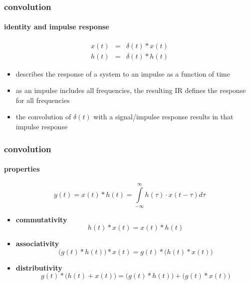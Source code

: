 \begin{frame}\frametitle{convolution}\framesubtitle{identity and impulse response}
    \begin{eqnarray*}
        x(t) &=& \delta(t)\ast x(t) \\
        h(t) &=& \delta(t)\ast h(t) 
    \end{eqnarray*}

    \bigskip
    \begin{itemize}
        \item<2->   describes the response of a system to an impulse as a function of time
        \smallskip
        \item<3->   as an impulse includes all frequencies, the resulting IR defines the response for all frequencies
        \smallskip
        \item<4->   the convolution of $\delta(t)$ with a signal/impulse response results in that impulse response
    \end{itemize}
\end{frame}
    
	\begin{frame}\frametitle{convolution}\framesubtitle{properties}
		\begin{equation*}
			y(t) = x(t) \ast h(t) = \int\limits_{-\infty}^{\infty}{h(\tau)\cdot x(t-\tau)} d\tau
		\end{equation*}
		\begin{itemize}
			\item	\textbf{commutativity}
				\begin{equation*}
					h(t) \ast x(t)	= x(t) \ast h(t)
				\end{equation*}
			\pause
			\item	\textbf{associativity}
				\begin{equation*}
					\big(g(t) \ast h(t)\big) \ast x(t) = g(t) \ast \big(h(t) \ast x(t)\big)
				\end{equation*}
			\pause
			\item	\textbf{distributivity}
				\begin{equation*}
					g(t) \ast \big(h(t) + x(t)\big) = \big(g(t) \ast h(t)\big) + \big(g(t) \ast x(t)\big)
				\end{equation*}
		\end{itemize}
\end{frame}

